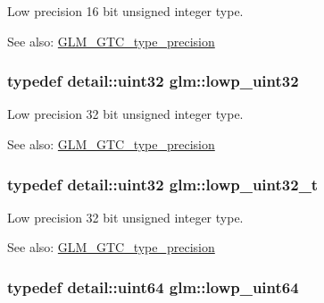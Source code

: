Low precision 16 bit unsigned integer type. \begin{Desc}
\item[See also:]\hyperlink{group__gtc__type__precision}{GLM\_\-GTC\_\-type\_\-precision} \end{Desc}
\hypertarget{group__gtc__type__precision_gf11e85af414720b4cd12bd57b3a81e68}{
\subsubsection[lowp\_\-uint32]{\setlength{\rightskip}{0pt plus 5cm}typedef detail::uint32 {\bf glm::lowp\_\-uint32}}}
\label{group__gtc__type__precision_gf11e85af414720b4cd12bd57b3a81e68}


Low precision 32 bit unsigned integer type. \begin{Desc}
\item[See also:]\hyperlink{group__gtc__type__precision}{GLM\_\-GTC\_\-type\_\-precision} \end{Desc}
\hypertarget{group__gtc__type__precision_g9f8cb602a358e1f48bda2682cf051f0c}{
\subsubsection[lowp\_\-uint32\_\-t]{\setlength{\rightskip}{0pt plus 5cm}typedef detail::uint32 {\bf glm::lowp\_\-uint32\_\-t}}}
\label{group__gtc__type__precision_g9f8cb602a358e1f48bda2682cf051f0c}


Low precision 32 bit unsigned integer type. \begin{Desc}
\item[See also:]\hyperlink{group__gtc__type__precision}{GLM\_\-GTC\_\-type\_\-precision} \end{Desc}
\hypertarget{group__gtc__type__precision_gcf666a9d9b309c4615c7a4f2ab0be289}{
\subsubsection[lowp\_\-uint64]{\setlength{\rightskip}{0pt plus 5cm}typedef detail::uint64 {\bf glm::lowp\_\-uint64}}}
\label{group__gtc__type__precision_gcf666a9d9b309c4615c7a4f2ab0be289}


